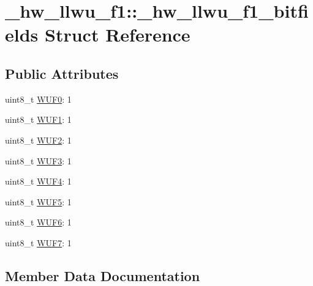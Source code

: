 \hypertarget{struct__hw__llwu__f1_1_1__hw__llwu__f1__bitfields}{}\section{\+\_\+hw\+\_\+llwu\+\_\+f1\+:\+:\+\_\+hw\+\_\+llwu\+\_\+f1\+\_\+bitfields Struct Reference}
\label{struct__hw__llwu__f1_1_1__hw__llwu__f1__bitfields}
\subsection*{Public Attributes}
\begin{DoxyCompactItemize}
\item 
uint8\+\_\+t \hyperlink{struct__hw__llwu__f1_1_1__hw__llwu__f1__bitfields_ace9d04d82c3c714bc6bfb12a5cf3aef2}{W\+U\+F0}\+: 1
\item 
uint8\+\_\+t \hyperlink{struct__hw__llwu__f1_1_1__hw__llwu__f1__bitfields_a0de4ff6ac1cef02d3c1e9be7d88f2b5e}{W\+U\+F1}\+: 1
\item 
uint8\+\_\+t \hyperlink{struct__hw__llwu__f1_1_1__hw__llwu__f1__bitfields_a92f8194705d32bc118ad551f7a7cc5b1}{W\+U\+F2}\+: 1
\item 
uint8\+\_\+t \hyperlink{struct__hw__llwu__f1_1_1__hw__llwu__f1__bitfields_ac790e40120b3a63b94e5095824d94c3e}{W\+U\+F3}\+: 1
\item 
uint8\+\_\+t \hyperlink{struct__hw__llwu__f1_1_1__hw__llwu__f1__bitfields_ab14bcd8fdda4f31d0d38d185ab94914f}{W\+U\+F4}\+: 1
\item 
uint8\+\_\+t \hyperlink{struct__hw__llwu__f1_1_1__hw__llwu__f1__bitfields_a5e3a24451d9ee51cfcc0bf41ff3c8000}{W\+U\+F5}\+: 1
\item 
uint8\+\_\+t \hyperlink{struct__hw__llwu__f1_1_1__hw__llwu__f1__bitfields_a6f2adcae900115eb57f01b08b8662b3f}{W\+U\+F6}\+: 1
\item 
uint8\+\_\+t \hyperlink{struct__hw__llwu__f1_1_1__hw__llwu__f1__bitfields_a820a54fd12d8150cc533d4ba28a0a5d0}{W\+U\+F7}\+: 1
\end{DoxyCompactItemize}


\subsection{Member Data Documentation}
